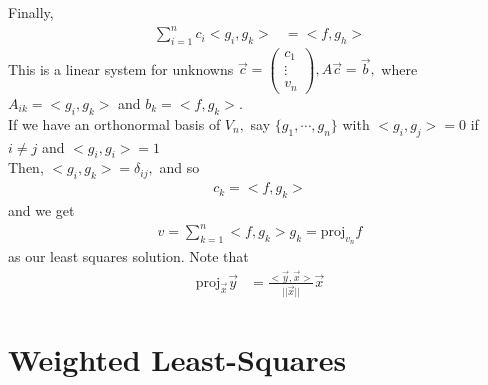 \documentclass[11pt,oneside]{book}
\theoremstyle{break}
\theoremstyle{break}
\begin{document}
  Finally, \begin{align*}
  \sum_{i=1}^nc_i<g_i,g_k>&=<f,g_h>
  \end{align*}
  This is a linear system for unknowns $\vec{c}=\begin{pmatrix}
  c_1\\
  \vdots\\
  v_n
  \end{pmatrix}, A\vec{c}=\vec{b},$ where $A_{ik}=<g_i,g_k>$ and $b_k=<f,g_k>$.\\
  If we have an orthonormal basis of $V_n,$ say $\{g_1,\cdots,g_n\}$ with $<g_i,g_j>=0$ if $i\neq j$ and $<g_i,g_i>=1$\\
  Then, $<g_i,g_k>=\delta_{ij},$ and so \begin{align*}
  c_k=<f,g_k>
  \end{align*}
  and we get \begin{align*}
  v=\sum_{k=1}^n<f,g_k>g_k=\text{proj}_{v_n}f
  \end{align*}
  as our least squares solution. Note that \begin{align*}
  \text{proj}_{\vec{x}}\vec{y}&=\frac{<\vec{y},\vec{x}>}{||\vec{x}||}\vec{x}
  \end{align*}
\section[Weighted Least-Squares]{Weighted Least-Squares}
\end{document}
